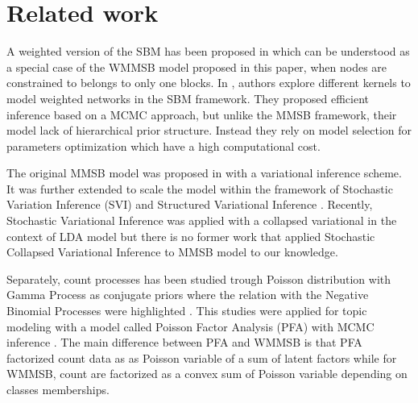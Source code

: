 \section{Related work}
\label{sec:rl}



A weighted version of the SBM has been proposed in \cite{aicher2014learning} which can be understood as a special case of the WMMSB model proposed in this paper, when nodes are constrained to belongs to only one blocks. In \cite{peixoto2018nonparametric}, authors explore different kernels to model weighted networks in the SBM framework. They proposed efficient inference based on a MCMC approach, but unlike the MMSB framework, their model lack of hierarchical prior structure. Instead they rely on model selection for parameters optimization which have a high computational cost.

The original MMSB model was proposed in \cite{airoldi2009mixed} with a variational inference scheme. It was further extended to scale the model within the framework of Stochastic Variation Inference (SVI) \cite{gopalan2013efficient} and Structured Variational Inference \cite{kim2013efficient}. Recently, Stochastic Variational Inference was applied with a collapsed variational in the context of LDA model \cite{foulds2013stochastic} but there is no former work that applied Stochastic Collapsed Variational Inference to MMSB model to our knowledge.

Separately, count processes has been studied trough Poisson distribution with Gamma Process as conjugate priors where the relation with the Negative Binomial Processes were highlighted \cite{zhou2012augment} \cite{zhou2015negative}. This studies were applied for topic modeling with a model called Poisson Factor Analysis (PFA) with MCMC inference \cite{zhou2012beta}. The main difference between PFA and WMMSB is that PFA factorized count data as as  Poisson variable of a sum of latent factors while for WMMSB, count are  factorized as a convex sum of Poisson variable depending on classes memberships.




